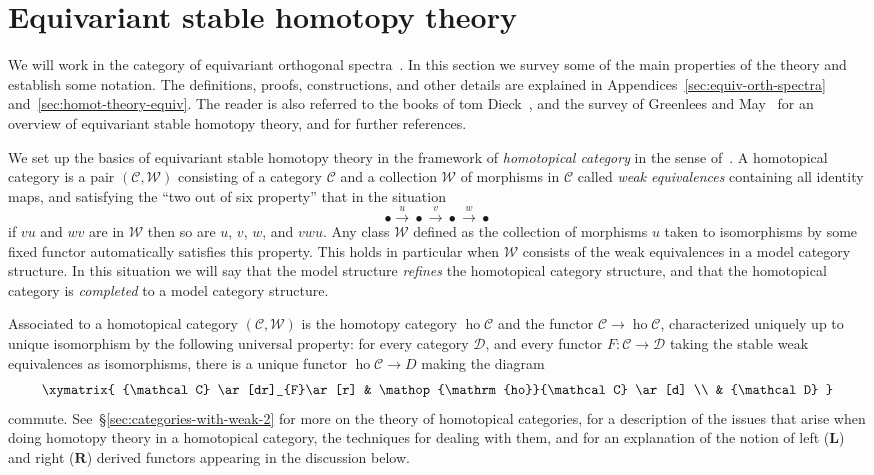 \documentclass{amsart}
\theoremstyle{definition}
\theoremstyle{remark}
\DeclareMathOperator{\ho}{ho}
\newcommand{\cat}[1]{{\mathcal #1}}
\newcommand{\lder}{\mathbf{L}}
\newcommand{\rder}{\mathbf{R}}
\begin{document}
\section{Equivariant stable homotopy theory}
\label{sec:some-equiv-stable}

We will work in the category of equivariant orthogonal
spectra~\cite{MR1806878,MR1922205}.  In this section we survey some of
the main properties of the theory and establish some notation.  The
definitions, proofs, constructions, and other details are explained in
Appendices~\ref{sec:equiv-orth-spectra}
and~\ref{sec:homot-theory-equiv}.  The reader is also referred to the
books of tom Dieck~\cite{MR889050,TtD:TGRT}, and the
survey of Greenlees and May~\cite{MR1361893} for an overview of
equivariant stable homotopy theory, and for further references.

We set up the basics of equivariant stable homotopy theory in the
framework of {\em homotopical category} in the sense
of~\cite{dwyer04:_homot}.  A homotopical category is a pair $(\cat C,
\cat W)$ consisting of a category $\cat C$ and a collection $\cat W$
of morphisms in $\cat C$ called {\em weak equivalences} containing all
identity maps, and satisfying the ``two out of six property'' that in
the situation
\[
\bullet \xrightarrow{u} \bullet \xrightarrow{v} \bullet
\xrightarrow{w} \bullet
\]
if $v u$ and $w v$ are in $\mathcal W$ then so are $u$, $v$, $w$, and
$v w u$.  Any class $\cat W$ defined as the collection of morphisms
$u$ taken to isomorphisms by some fixed functor automatically
satisfies this property.  This holds in particular when $\cat W$
consists of the weak equivalences in a model category structure.  In
this situation we will say that the model structure {\em refines} the
homotopical category structure, and that the homotopical category is
{\em completed} to a model category structure.  

Associated to a homotopical category $(\cat C, \cat W)$ is the homotopy category
$\ho\cat C$ and the functor $\cat C\to\ho\cat C$, 
characterized uniquely up to unique isomorphism by the following
universal property: for every category $\cat D$, and every functor
$F:\cat C\to \cat D$ taking the stable weak equivalences as
isomorphisms, there is a unique functor $\ho \cat C\to D$
making the diagram
\[
\xymatrix{
\cat C \ar[dr]_{F}\ar[r] & \ho\cat C \ar[d] \\
& \cat D 
}
\]
commute.    See~\S\ref{sec:categories-with-weak-2} for more on the theory of
homotopical categories, for a description of the issues that arise
when doing homotopy theory in a homotopical category, the techniques
for dealing with them, and for an explanation of the notion of left
($\lder$) and right ($\rder$) derived functors appearing in the
discussion below.  
\end{document}
